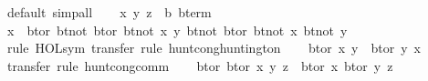 \begin{isabellebody}
%
\isadelimproof
%
\endisadelimproof
%
\isatagproof
{}\isamarkupfalse%
\ {}default{}\ simp{}all{}\isanewline
\ \ \isamarkupfalse%
\ x\ y\ z\ {}{}\ {}{}b\ bterm{}\isanewline
\ \ \isamarkupfalse%
\ {}x\ {}\ bt{}or\ {}bt{}not\ {}bt{}or\ {}bt{}not\ x{}\ y{}{}\ {}bt{}not\ {}bt{}or\ {}bt{}not\ x{}\ {}bt{}not\ y{}{}{}{}\isanewline
\ \ \ \ \isamarkupfalse%
\ {}rule\ HOL{}sym{}\ transfer{}\ rule\ hunt{}cong{}huntington{}\isanewline
\ \ \isamarkupfalse%
\ {}bt{}or\ x\ y\ {}\ bt{}or\ y\ x{}\isanewline
\ \ \ \ \isamarkupfalse%
\ {}transfer{}\ rule\ hunt{}cong{}comm{}\isanewline
\ \ \isamarkupfalse%
\ {}bt{}or\ {}bt{}or\ x\ y{}\ z\ {}\ bt{}or\ x\ {}bt{}or\ y\ z{}{}\isanewline

\end{isabellebody}
